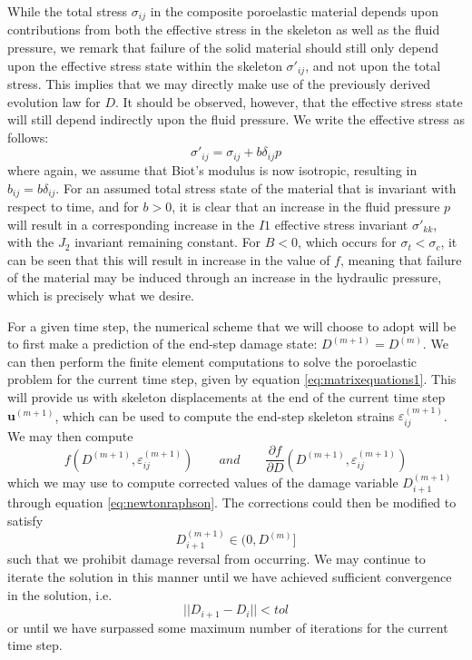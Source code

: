 \documentclass[11pt]{article} %
\begin{document}
While the total stress $\sigma_{ij}$ in the composite poroelastic material depends upon contributions from both the effective stress in the skeleton as well as the fluid pressure, we remark that failure of the solid material should still only depend upon the effective stress state within the skeleton $\sigma'_{ij}$, and not upon the total stress. This implies that we may directly make use of the previously derived evolution law for $D$. It should be observed, however, that the effective stress state will still depend indirectly upon the fluid pressure. We write the effective stress as follows:
\begin{equation}
	\sigma'_{ij} = \sigma_{ij} + b \delta_{ij} p
\end{equation}
where again, we assume that Biot's modulus is now isotropic, resulting in $b_{ij} = b \delta_{ij}$. For an assumed total stress state of the material that is invariant with respect to time, and for $b > 0$, it is clear that an increase in the fluid pressure $p$ will result in a corresponding increase in the $I1$ effective stress invariant $\sigma'_{kk}$, with the $J_2$ invariant remaining constant. For $B < 0$, which occurs for $\sigma_t < \sigma_c$, it can be seen that this will result in increase in the value of $f$, meaning that failure of the material may be induced through an increase in the hydraulic pressure, which is precisely what we desire.

For a given time step, the numerical scheme that we will choose to adopt will be to first make a prediction of the end-step damage state: $D^{(m+1)} = D^{(m)}$. We can then perform the finite element computations to solve the poroelastic problem for the current time step, given by equation \ref{eq:matrixequations1}. This will provide us with skeleton displacements at the end of the current time step $\textbf{u}^{(m+1)}$, which can be used to compute the end-step skeleton strains $\varepsilon^{(m+1)}_{ij}$. We may then compute
\begin{equation}
	f(D^{(m+1)},\varepsilon^{(m+1)}_{ij}) \qquad and \qquad \frac{\partial f}{\partial D} (D^{(m+1)},\varepsilon^{(m+1)}_{ij})
\end{equation}
which we may use to compute corrected values of the damage variable $D^{(m+1)}_{i+1}$ through equation \ref{eq:newtonraphson}. The corrections could then be modified to satisfy
\begin{equation}
	D^{(m+1)}_{i+1} \in (0,D^{(m)} ]
\end{equation}
such that we prohibit damage reversal from occurring. We may continue to iterate the solution in this manner until we have achieved sufficient convergence in the solution, i.e.
\begin{equation}
	|| D_{i+1} - D_{i} || < tol
	\label{eq:oldnorm}
\end{equation}
or until we have surpassed some maximum number of iterations for the current time step.
\end{document}
